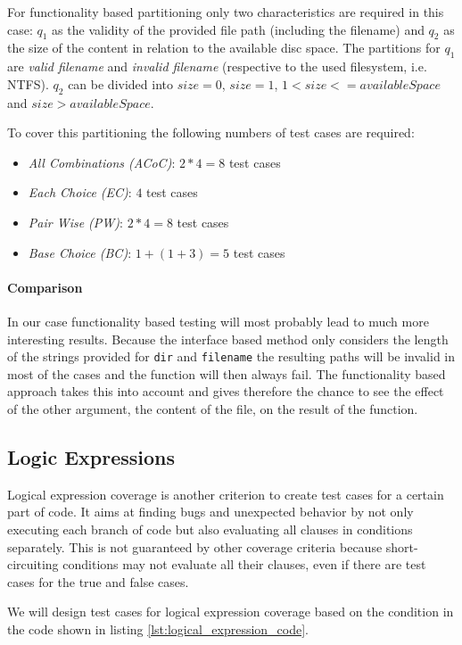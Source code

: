 \documentclass{scrreprt}
\begin{document}
For functionality based partitioning only two characteristics are required in this case: $q_1$ as the validity of the provided file path (including the filename) and $q_2$ as the size of the content in relation to the available disc space. The partitions for $q_1$ are \textit{valid filename} and \textit{invalid filename} (respective to the used filesystem, i.e. NTFS). $q_2$ can be divided into $size=0$, $size=1$, $1<size<=availableSpace$ and $size>availableSpace$.

To cover this partitioning the following numbers of test cases are required:
\begin{itemize}
	\item \textit{All Combinations (ACoC)}: $2*4=8$ test cases
	\item \textit{Each Choice (EC)}: $4$ test cases
	\item \textit{Pair Wise (PW)}: $2*4=8$ test cases
	\item \textit{Base Choice (BC)}: $1+(1+3)=5$ test cases
\end{itemize}

\paragraph{Comparison}

In our case functionality based testing will most probably lead to much more interesting results. Because the interface based method only considers the length of the strings provided for \texttt{dir} and \texttt{filename} the resulting paths will be invalid in most of the cases and the function will then always fail. The functionality based approach takes this into account and gives therefore the chance to see the effect of the other argument, the content of the file, on the result of the function.

\subsection{Logic Expressions}

Logical expression coverage is another criterion to create test cases for a certain part of code. It aims at finding bugs and unexpected behavior by not only executing each branch of code but also evaluating all clauses in conditions separately. This is not guaranteed by other coverage criteria because short-circuiting conditions may not evaluate all their clauses, even if there are test cases for the true and false cases.

We will design test cases for logical expression coverage based on the condition in the code shown in listing \ref{lst:logical_expression_code}.
\end{document}
